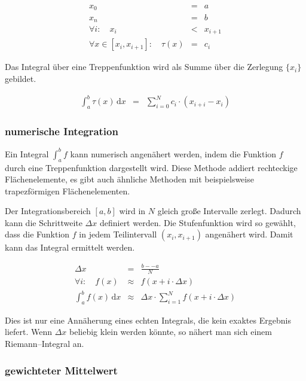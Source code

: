 \documentclass[12pt,a4paper]{scrartcl}
\numberwithin{equation}{section} %
\begin{document}
	\begin{eqnarray}
		x_0 &=& a \\
		x_n &=& b \\
		\forall i:\quad
		x_i &<& x_{i+1} \\
		\forall x\in[x_i, x_{i+1}]:\quad
		\tau(x) &=& c_i
	\end{eqnarray}
	
	\noindent
	Das Integral über eine Treppenfunktion wird als Summe über die Zerlegung $\{x_i\}$ gebildet.
	
	\begin{eqnarray}
		\int_a^b\tau(x)\,\mathrm dx
		&=& \sum_{i=0}^N c_i\cdot (x_{i+i}-x_i)
	\end{eqnarray}
	
	\hypertarget{numerische-integration}{%
		\subsubsection{numerische Integration}\label{numerische-integration}}
	
	Ein Integral $\int_a^b f$ kann numerisch angenähert werden, indem die Funktion $f$ durch eine Treppenfunktion dargestellt wird. Diese Methode addiert rechteckige Flächenelemente, es gibt auch ähnliche Methoden mit beispielsweise trapezförmigen Flächenelementen.
	
	Der Integrationsbereich $[a,b]$ wird in $N$ gleich große Intervalle zerlegt. Dadurch kann die Schrittweite $\Delta x$ definiert werden. Die Stufenfunktion wird so gewählt, dass die Funktion $f$ in jedem Teilintervall $(x_i, x_{i+1})$ angenähert wird. Damit kann das Integral ermittelt werden.
	
	\begin{eqnarray}
		\Delta x &=& \frac{b--a}{N} \\
		\forall i:\quad
		f(x) &\approx& f(x+i\cdot\Delta x) \\
		\int_a^b f(x) \,\mathrm dx
		&\approx& \Delta x\cdot
		\sum_{i=1}^N f(x + i\cdot \Delta x)
	\end{eqnarray}
	
	\noindent
	Dies ist nur eine Annäherung eines echten Integrals, die kein exaktes Ergebnis liefert. Wenn $\Delta x$ beliebig klein werden könnte, so nähert man sich einem Riemann--Integral an.
	
	\hypertarget{gewichteter-mittelwert}{%
		\subsubsection{gewichteter Mittelwert}\label{gewichteter-mittelwert}}
	
\end{document}
